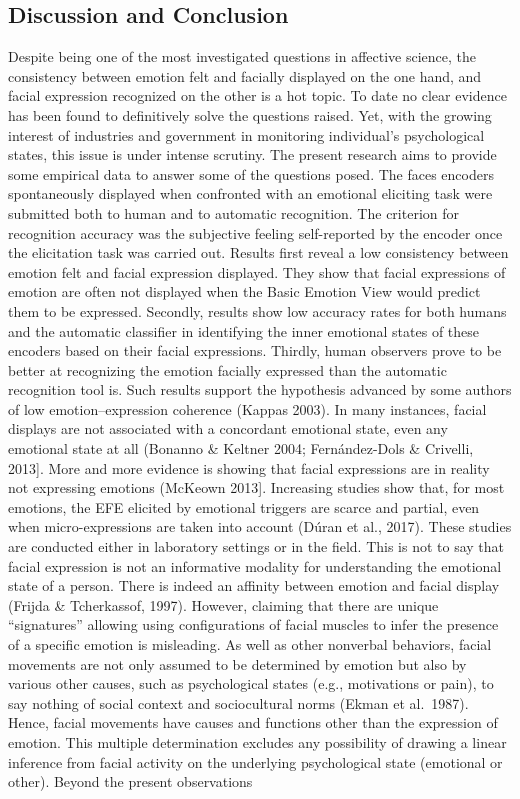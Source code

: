 \documentclass[man]{apa6}
\begin{document}
\hypertarget{discussion-and-conclusion}{%
\subsection{Discussion and Conclusion}\label{discussion-and-conclusion}}

Despite being one of the most investigated questions in affective science, the consistency between emotion felt and facially displayed on the one hand, and facial expression recognized on the other is a hot topic. To date no clear evidence has been found to definitively solve the questions raised. Yet, with the growing interest of industries and government in monitoring individual's psychological states, this issue is under intense scrutiny. The present research aims to provide some empirical data to answer some of the questions posed. The faces encoders spontaneously displayed when confronted with an emotional eliciting task were submitted both to human and to automatic recognition. The criterion for recognition accuracy was the subjective feeling self-reported by the encoder once the elicitation task was carried out. Results first reveal a low consistency between emotion felt and facial expression displayed. They show that facial expressions of emotion are often not displayed when the Basic Emotion View would predict them to be expressed. Secondly, results show low accuracy rates for both humans and the automatic classifier in identifying the inner emotional states of these encoders based on their facial expressions. Thirdly, human observers prove to be better at recognizing the emotion facially expressed than the automatic recognition tool is. Such results support the hypothesis advanced by some authors of low emotion--expression coherence (Kappas 2003). In many instances, facial displays are not associated with a concordant emotional state, even any emotional state at all (Bonanno \& Keltner 2004; Fernández-Dols \& Crivelli, 2013{]}. More and more evidence is showing that facial expressions are in reality not expressing emotions (McKeown 2013{]}. Increasing studies show that, for most emotions, the EFE elicited by emotional triggers are scarce and partial, even when micro-expressions are taken into account (Dúran et al., 2017). These studies are conducted either in laboratory settings or in the field. This is not to say that facial expression is not an informative modality for understanding the emotional state of a person. There is indeed an affinity between emotion and facial display (Frijda \& Tcherkassof, 1997). However, claiming that there are unique \enquote{signatures} allowing using configurations of facial muscles to infer the presence of a specific emotion is misleading. As well as other nonverbal behaviors, facial movements are not only assumed to be determined by emotion but also by various other causes, such as psychological states (e.g., motivations or pain), to say nothing of social context and sociocultural norms (Ekman et al.~1987). Hence, facial movements have causes and functions other than the expression of emotion. This multiple determination excludes any possibility of drawing a linear inference from facial activity on the underlying psychological state (emotional or other). Beyond the present observations 
\end{document}
